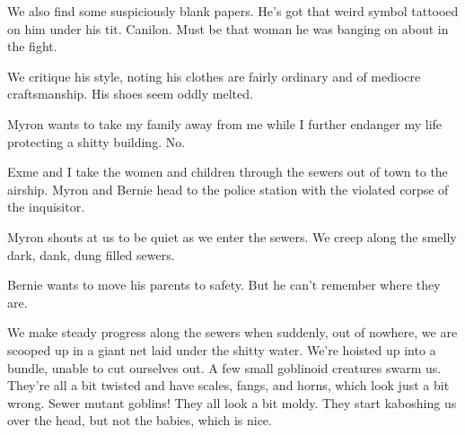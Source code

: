 We also find some suspiciously blank papers. He’s got that weird symbol tattooed on him under his tit. Canilon. Must be that woman he was banging on about in the fight.\medskip

We critique his style, noting his clothes are fairly ordinary and of mediocre craftsmanship. His shoes seem oddly melted.\medskip

Myron wants to take my family away from me while I further endanger my life protecting a shitty building. No.\medskip

Exme and I take the women and children through the sewers out of town to the airship. Myron and Bernie head to the police station with the violated corpse of the inquisitor.\medskip

Myron shouts at us to be quiet as we enter the sewers. We creep along the smelly dark, dank, dung filled sewers.\medskip

Bernie wants to move his parents to safety. But he can’t remember where they are.\medskip

We make steady progress along the sewers when suddenly, out of nowhere, we are scooped up in a giant net laid under the shitty water. We’re hoisted up into a bundle, unable to cut ourselves out. A few small goblinoid creatures swarm us. They’re all a bit twisted and have scales, fangs, and horns, which look just a bit wrong. Sewer mutant goblins! They all look a bit moldy. They start kaboshing us over the head, but not the babies, which is nice.\medskip

%

\clearpage
